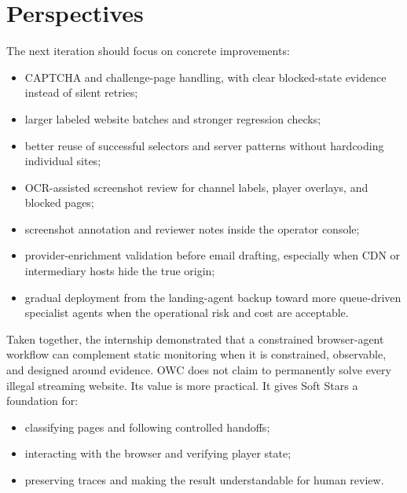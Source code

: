 \section{Perspectives}

The next iteration should focus on concrete improvements:
\begin{itemize}
  \item CAPTCHA and challenge-page handling, with clear blocked-state evidence instead
  of silent retries;
  \item larger labeled website batches and stronger regression checks;
  \item better reuse of successful selectors and server patterns without hardcoding
  individual sites;
  \item OCR-assisted screenshot review for channel labels, player overlays, and blocked
  pages;
  \item screenshot annotation and reviewer notes inside the operator console;
  \item provider-enrichment validation before email drafting, especially when CDN or
  intermediary hosts hide the true origin;
  \item gradual deployment from the landing-agent backup toward more queue-driven
  specialist agents when the operational risk and cost are acceptable.
\end{itemize}

Taken together, the internship demonstrated that a constrained browser-agent workflow can
complement static monitoring when it is constrained, observable, and designed around
evidence. OWC does not claim to permanently solve every illegal streaming website. Its
value is more practical. It gives Soft Stars a foundation for:
\begin{itemize}
  \item classifying pages and following controlled handoffs;
  \item interacting with the browser and verifying player state;
  \item preserving traces and making the result understandable for human review.
\end{itemize}
